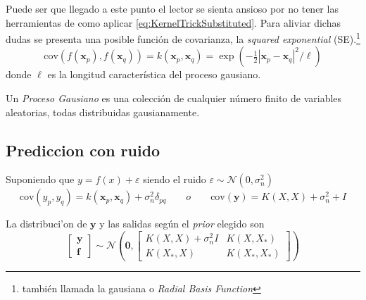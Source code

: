 \documentclass{article}
\newcommand{\vectorbold}[1]{\mathbf{#1}}
\newcommand{\func}{f}
\newcommand{\GD}{\mathcal{N}}
\newcommand{\sn}{\sigma_{n}}
\newcommand{\xbold}{\vectorbold{x}}
\newcommand{\ybold}{\vectorbold{y}}
\newcommand{\fbold}{\vectorbold{f}}
\newcommand{\cov}{\textrm{cov}}
\begin{document}
Puede ser que llegado a este punto el lector se sienta ansioso por no tener las herramientas de como aplicar \ref{eq:KernelTrickSubstituted}. Para aliviar dichas dudas se presenta una posible función de covarianza, la \textit{squared exponential} (SE).\footnote{también llamada la gausiana o \textit{Radial Basis Function}}
\begin{equation}
    \cov(\func(\xbold_p),\func(\xbold_q)) = k(\xbold_p,\xbold_q) = \exp(-\tfrac{1}{2}\left|\xbold_p-\xbold_q \right|^2/\ell)
\end{equation}
donde $\ell$ es la longitud característica del proceso gausiano.



\begin{define}
Un \emph{Proceso Gausiano} es una colección de cualquier número finito de variables aleatorias, todas distribuidas gausianamente.
\end{define}

\subsection{Prediccion con ruido}
Suponiendo que $y=\func(x)+\varepsilon$ siendo el ruido $\varepsilon \sim \GD(0,\sigma_n^2)$
\[
\cov (y_p,y_q) = k(\xbold_p,\xbold_q) +\sn^2\delta_{pq} \qquad o \qquad \cov (\ybold) = K(X,X)+\sn^2+I
\]

La distribuci'on de $\ybold$ y las salidas según el \textit{prior} elegido son
\[
\begin{bmatrix}
\ybold \\
\fbold
\end{bmatrix}\sim
\GD\left(\mathbf{0},
\begin{bmatrix}
K(X,X)+\sn^2I & K(X,X_*) \\
K(X_*,X) & K(X_*,X_*)
\end{bmatrix}
\right)
\]
\end{document}
